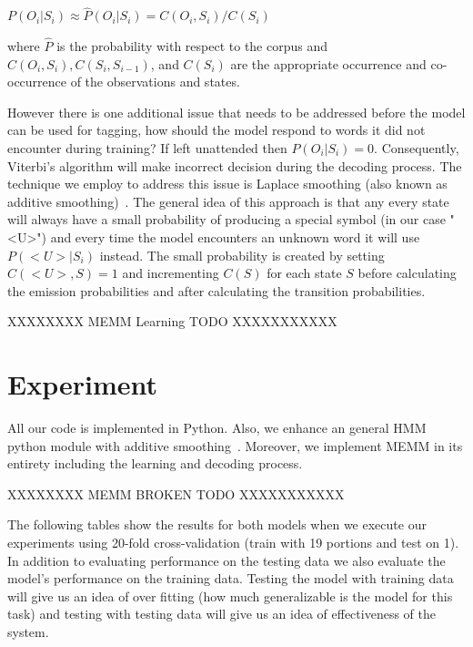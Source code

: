 \documentclass{acm_proc_article-sp}
\begin{document}
$P( O_i | S_i ) \approx \hat{P}( O_i | S_i ) = C( O_i, S_i )/C( S_i )$

where $\hat{P}$ is the probability with respect to the corpus and $C( O_i, S_i ), C( S_i, S_{i-1} )$, and $C( S_i )$ are the appropriate occurrence and co-occurrence of the observations and states.

However there is one additional issue that needs to be addressed before the model can be used for tagging, how should the model respond to words it did not encounter during training? If left unattended then $P( O_i | S_i ) = 0$. Consequently, Viterbi's algorithm will make incorrect decision during the decoding process. The technique we employ to address this issue is Laplace smoothing (also known as additive smoothing)~\cite{laplaceSmooth}. The general idea of this approach is that any every state will always have a small probability of producing a special symbol (in our case "<U>") and every time the model encounters an unknown word it will use $P( <U> | S_i )$ instead. The small probability is created by setting $C( <U>, S ) = 1$ and incrementing $C( S )$ for each state $S$ before calculating the emission probabilities and after calculating the transition probabilities.

XXXXXXXX MEMM Learning TODO XXXXXXXXXXX

\section{Experiment}
All our code is implemented in Python. Also, we enhance an general HMM python module with additive smoothing~\cite{hmmCode}. Moreover, we implement MEMM in its entirety including the learning and decoding process. 

XXXXXXXX MEMM BROKEN TODO XXXXXXXXXXX

The following tables show the results for both models when we execute our experiments using 20-fold cross-validation (train with 19 portions and test on 1). In addition to evaluating performance on the testing data we also evaluate the model's performance on the training data. Testing the model with training data will give us an idea of over fitting (how much generalizable is the model for this task) and testing with testing data will give us an idea of effectiveness of the system.
\end{document}
